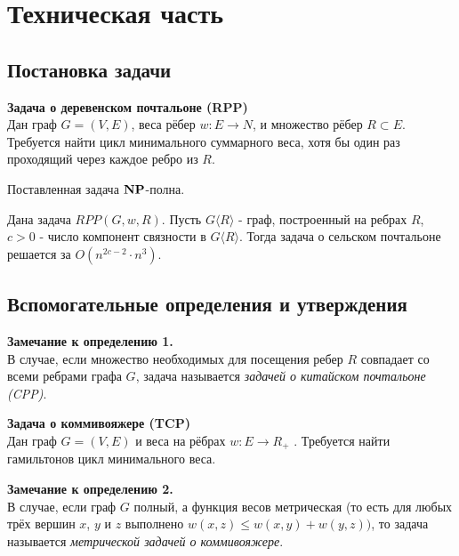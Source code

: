 \newpage
\section{Техническая часть}

\subsection{Постановка задачи}
\begin{definition}
\textbf{Задача о деревенском почтальоне (\textsf{RPP})} \\
Дан граф $G=(V,E)$, веса рёбер $w:E \rightarrow N$, и множество рёбер $R \subset E$. Требуется найти цикл минимального суммарного веса, хотя бы один раз проходящий через каждое ребро из $R$.
\end{definition}

\begin{statement}
Поставленная задача $\bf{NP}$-полна.
\end{statement}

\begin{theorem}
 Дана задача $RPP(G, w, R)$. Пусть $G\langle R \rangle$ - граф, построенный на ребрах $R$, $c > 0$ - число компонент связности в $G \langle R \rangle$. Тогда задача о сельском почтальоне решается за $O(n^{2c-2} \cdot n^3)$. 
\end{theorem}

\subsection{Вспомогательные определения и утверждения}

\textbf{Замечание к определению 1.} \\
В случае, если множество необходимых для посещения ребер $R$ совпадает со всеми ребрами графа $G$, задача называется \textit{задачей о китайском почтальоне (\textsf{CPP})}.

\begin{definition}
\textbf{Задача о коммивояжере (\textsf{TCP})} \\
Дан граф $G = (V, E)$ и веса
на рёбрах $w : E \rightarrow R_+$ . Требуется найти гамильтонов цикл минимального веса.
\end{definition}

\textbf{Замечание к определению 2.} \\
В случае, если граф $G$ полный, а функция весов метрическая (то есть для
любых трёх вершин $x$, $y$ и $z$ выполнено $w(x, z) \leq w(x, y) + w(y, z))$, то задача называется \textit{метрической задачей о коммивояжере}.
